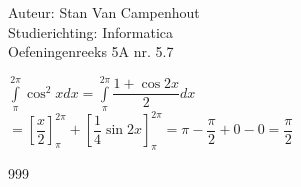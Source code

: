 \documentclass[a4paper]{article}
\begin{document}
  
\noindent \large Auteur: Stan Van Campenhout \\
\noindent \large Studierichting:  Informatica\\
\noindent \large Oefeningenreeks 5A nr. 5.7\\

\medskip

\normalsize

$ \displaystyle\int\limits_\pi^{2\pi}\cos^2x dx = \displaystyle\int\limits_\pi^{2\pi} \dfrac{1+\cos 2x}{2} dx $\\

$ = \left[\dfrac{x}{2}\right]_\pi^{2\pi} + \left[\dfrac{1}{4}\sin 2x\right]_\pi^{2\pi} = \pi - \dfrac{\pi}{2} + 0 - 0 = \dfrac{\pi}{2} $\\

\begin{thebibliography}{999}
\end{thebibliography}
\end{document}
